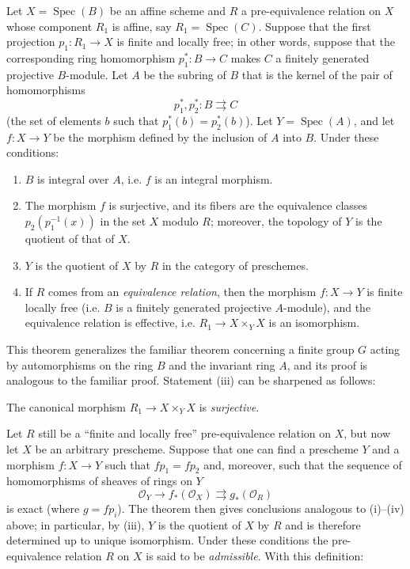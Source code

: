 Let $X=\operatorname{Spec}(B)$ be an affine scheme and
$R$ a pre-equivalence relation on $X$ whose component $R_1$ is affine, say
$R_1=\operatorname{Spec}(C)$. Suppose that the first projection
$p_1:R_1\to X$ is finite and locally free; in other words, suppose that the
corresponding ring homomorphism $p_1^*:B\to C$ makes $C$ a finitely generated
projective $B$-module. Let $A$ be the subring of $B$ that is the kernel of the
pair of homomorphisms
\[
  p_1^*,p_2^*:B\rightrightarrows C
\]
(the set of elements $b$ such that $p_1^*(b)=p_2^*(b)$). Let
$Y=\operatorname{Spec}(A)$, and let $f:X\to Y$ be the morphism defined by the
inclusion of $A$ into $B$. Under these conditions:
\begin{enumerate}
\item[(i)] $B$ is integral over $A$, i.e. $f$ is an integral morphism.

\item[(ii)] The morphism $f$ is surjective, and its fibers are the equivalence
classes
$p_2(p_1^{-1}(x))$ in the set $X$ modulo $R$; moreover, the topology of $Y$ is
the quotient of that of $X$.

\item[(iii)] $Y$ is the quotient of $X$ by $R$ in the category of preschemes.

\item[(iv)] If $R$ comes from an \emph{equivalence relation}, then the
morphism $f:X\to Y$ is finite locally free (i.e. $B$ is a finitely generated
projective $A$-module), and the equivalence relation is effective, i.e.
$R_1\to X\times_Y X$ is an isomorphism.
\end{enumerate}

This theorem generalizes the familiar theorem concerning a finite group $G$
acting by automorphisms on the ring $B$ and the invariant ring $A$, and its
proof is analogous to the familiar proof. Statement (iii) can be sharpened as
follows:

 The canonical morphism
$R_1\to X\times_Y X$ is \emph{surjective}.

Let $R$ still be a ``finite and locally free'' pre-equivalence relation on
$X$, but now let $X$ be an arbitrary prescheme. Suppose that one can find a
prescheme $Y$ and a morphism $f:X\to Y$ such that $fp_1=fp_2$ and, moreover,
such that the sequence of homomorphisms of sheaves of rings on $Y$
\[
  \mathcal O_Y\longrightarrow f_*(\mathcal O_X)
  \rightrightarrows g_*(\mathcal O_R)
\]
is exact (where $g=fp_i$). The theorem then gives conclusions analogous to
(i)--(iv) above; in particular, by (iii), $Y$ is the quotient of $X$ by $R$
and is therefore determined up to unique isomorphism. Under these conditions
the pre-equivalence relation $R$ on $X$ is said to be \emph{admissible}. With
this definition:

